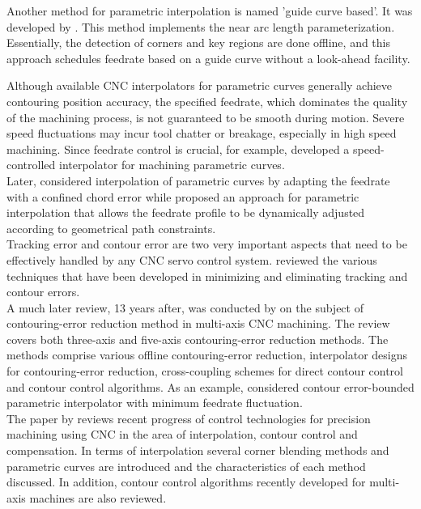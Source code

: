 Another method for parametric interpolation is named 'guide curve based'. It was developed by \cite{Sun-etal:2006}. This method implements the near arc length parameterization. Essentially, the detection of corners and key regions are done offline, and this approach schedules feedrate based on a guide curve without a look-ahead facility. \\ 

\clearpage
\pagebreak


Although available CNC interpolators for parametric curves generally achieve contouring position accuracy, the specified feedrate, which dominates the quality of the machining process, is not guaranteed to be smooth during motion. Severe speed fluctuations may incur tool chatter or breakage, especially in high speed machining. Since feedrate control is crucial, \cite{Yeh-etal:1999} for example, developed a speed-controlled interpolator for machining parametric curves. \\

Later, \cite{Yeh-etal:2002} considered interpolation of parametric curves by adapting the feedrate with a confined chord error while  \cite{Nam-etal:2004} proposed an approach for parametric interpolation that allows the feedrate profile to be dynamically adjusted according to geometrical path constraints. \\

Tracking error and contour error are two very important aspects that need to be effectively handled by any CNC servo control system.  \cite{Ramesh-etal:2005} reviewed the various techniques that have been developed in minimizing and eliminating tracking and contour errors.\\ 

A much later review, 13 years after, was conducted by \cite{Jia-etal:2018} on the subject of contouring-error reduction method in multi-axis CNC machining. The review covers both three-axis and ﬁve-axis contouring-error reduction methods. The methods comprise various offline contouring-error reduction, interpolator designs for contouring-error reduction, cross-coupling schemes for direct contour control and contour control algorithms. As an example, \cite{Chen-etal:2019} considered contour error-bounded parametric interpolator with minimum feedrate fluctuation. \\

The paper by \cite {Lee-etal:2018} reviews recent progress of control technologies for precision machining using CNC in the area of interpolation, contour control and compensation. In terms of interpolation several corner blending methods and parametric curves are introduced and the characteristics of each method discussed. In addition, contour control algorithms recently developed for multi-axis machines are also reviewed.\\

